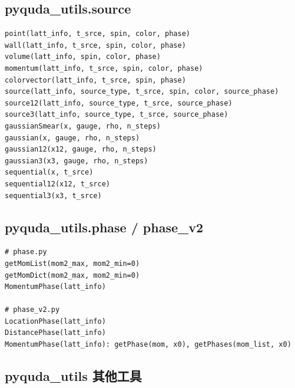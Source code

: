 \documentclass[12pt,a4paper]{ctexart}
\begin{document}
\subsection{pyquda\_utils.source}

\begin{lstlisting}[style=pycode]
point(latt_info, t_srce, spin, color, phase)
wall(latt_info, t_srce, spin, color, phase)
volume(latt_info, spin, color, phase)
momentum(latt_info, t_srce, spin, color, phase)
colorvector(latt_info, t_srce, spin, phase)
source(latt_info, source_type, t_srce, spin, color, source_phase)
source12(latt_info, source_type, t_srce, source_phase)
source3(latt_info, source_type, t_srce, source_phase)
gaussianSmear(x, gauge, rho, n_steps)
gaussian(x, gauge, rho, n_steps)
gaussian12(x12, gauge, rho, n_steps)
gaussian3(x3, gauge, rho, n_steps)
sequential(x, t_srce)
sequential12(x12, t_srce)
sequential3(x3, t_srce)
\end{lstlisting}

\subsection{pyquda\_utils.phase / phase\_v2}

\begin{lstlisting}[style=pycode]
# phase.py
getMomList(mom2_max, mom2_min=0)
getMomDict(mom2_max, mom2_min=0)
MomentumPhase(latt_info)

# phase_v2.py
LocationPhase(latt_info)
DistancePhase(latt_info)
MomentumPhase(latt_info): getPhase(mom, x0), getPhases(mom_list, x0)
\end{lstlisting}

\subsection{pyquda\_utils 其他工具}
\end{document}
